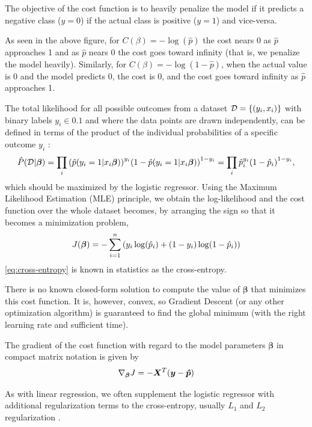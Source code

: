 The objective of the cost function is to heavily penalize the model if it predicts a negative class ($y=0$) if the actual class is positive ($y=1$) and vice-versa. \cite{Hands-onML}

As seen in the above figure, for $C(\beta) = - \log(\hat{p})$ the cost nears 0 as $\hat{p}$ approaches 1 and as $\hat{p}$ nears 0 the cost goes toward infinity (that is, we penalize the model heavily). Similarly, for $C(\beta) = - \log(1 - \hat{p})$, when the actual value is 0 and the model predicts 0, the cost is 0, and the cost goes toward infinity as $\hat{p}$ approaches 1.

The total likelihood for all possible outcomes from a dataset $\mathcal{D} = \qty{\qty(y_i, x_i)}$ with binary labels $y_i \in \qty{0,1}$ and where the data points are drawn independently, can be defined in terms of the product of the individual probabilities of a specific outcome $y_i$ \cite{logreglec}:
\begin{equation}
    \hat{P} (\mathcal{D} | \bm{\beta}) = \prod_i \qty(\hat{p}\qty(y_i = 1 | x_i \bm{\beta}))^{y_i} \qty(1 - \hat{p}\qty(y_i = 1 | x_i \bm{\beta}))^{1-y_i} = \prod_i \hat{p}_i^{y_i} \qty(1 - \hat{p}_i)^{1-y_i},
\end{equation}
which should be maximized by the logistic regressor. Using the Maximum Likelihood Estimation (MLE) principle, we obtain the log-likelihood and the cost function over the whole dataset becomes, by arranging the sign so that it becomes a minimization problem,
\begin{equation}\label{eq:cross-entropy}
    J (\bm{\beta}) = - \sum_{i=1}^n \qty(y_i \log(\hat{p}_i) + (1-y_i) \log(1 - \hat{p}_i) )
\end{equation}
\autoref{eq:cross-entropy} is known in statistics as the cross-entropy.

There is no known closed-form solution to compute the value of $\bm{\beta}$ that minimizes this cost function. It is, however, convex, so Gradient Descent (or any other optimization algorithm) is guaranteed to find the global minimum (with the right learning rate and sufficient time). \cite{Hands-onML} 

The gradient of the cost function with regard to the model parameters $\bm{\beta}$ in compact matrix notation is given by
\begin{equation}\label{eq:logcost deriv}
    \nabla_{\bm{\beta}} J = -\bm{X}^T \qty(\bm{y} -\bm{\hat{p}})
\end{equation}

As with linear regression, we often supplement the logistic regressor with additional regularization terms to the cross-entropy, usually $L_1$ and $L_2$ regularization \cite{logreglec}.


